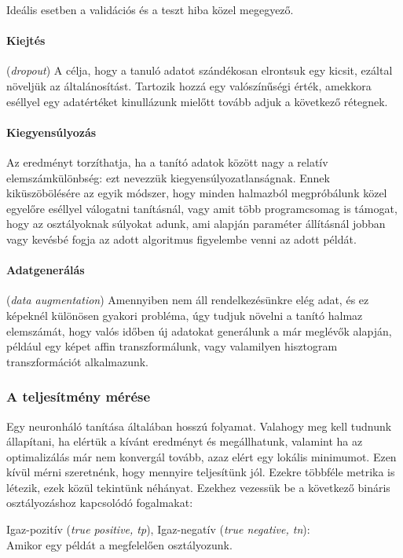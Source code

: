 Ideális esetben a validációs és a teszt hiba közel megegyező.


\paragraph{Kiejtés} (\textit{dropout})
A célja, hogy a tanuló adatot szándékosan elrontsuk egy kicsit, ezáltal 
növeljük az általánosítást.
Tartozik hozzá egy valószínűségi érték, amekkora eséllyel
egy adatértéket kinullázunk mielőtt tovább adjuk a következő rétegnek.


\paragraph{Kiegyensúlyozás}
Az eredményt torzíthatja, ha a tanító adatok között
nagy a relatív elemszámkülönbség: ezt nevezzük kiegyensúlyozatlanságnak.
Ennek kiküszöbölésére az egyik módszer, hogy minden halmazból 
megpróbálunk közel egyelőre eséllyel válogatni tanításnál, vagy
amit több programcsomag is támogat, hogy az osztályoknak súlyokat adunk,
ami alapján paraméter állításnál jobban vagy kevésbé fogja
az adott algoritmus figyelembe venni az adott példát.

\paragraph{Adatgenerálás} (\textit{data augmentation})
Amennyiben nem áll rendelkezésünkre elég adat, és ez képeknél 
különösen gyakori probléma, úgy tudjuk növelni a tanító halmaz
elemszámát, hogy valós időben új adatokat generálunk a már
meglévők alapján, például egy képet affin transzformálunk,
vagy valamilyen hisztogram transzformációt alkalmazunk.


\subsubsection{A teljesítmény mérése}

Egy neuronháló tanítása általában hosszú folyamat. Valahogy meg kell
tudnunk állapítani, ha elértük a kívánt eredményt és megállhatunk,
valamint ha az optimalizálás már nem konvergál tovább, azaz elért egy 
lokális minimumot.
Ezen kívül mérni szeretnénk, hogy mennyire teljesítünk jól. 
Ezekre többféle metrika is létezik, ezek közül tekintünk néhányat.
Ezekhez vezessük be a következő bináris osztályozáshoz kapcsolódó fogalmakat:


Igaz-pozitív (\textit{true positive, tp}), 
Igaz-negatív (\textit{true negative, tn}): \\
Amikor egy példát a megfelelően osztályozunk.

